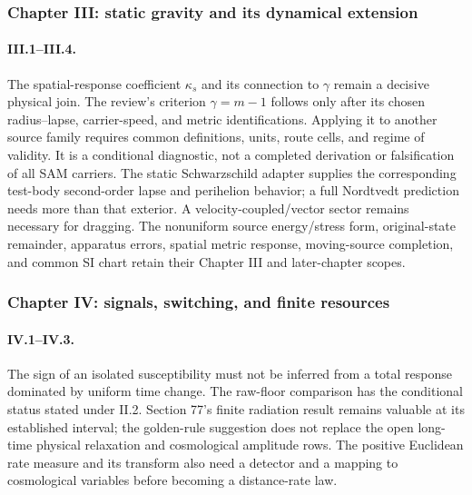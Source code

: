 \subsubsection*{Chapter III: static gravity and its dynamical extension}

\paragraph{III.1--III.4.}
The spatial-response coefficient $\kappa_s$ and its connection to $\gamma$ remain a decisive physical join. The review's criterion $\gamma=m-1$ follows only after its chosen radius--lapse, carrier-speed, and metric identifications. Applying it to another source family requires common definitions, units, route cells, and regime of validity. It is a conditional diagnostic, not a completed derivation or falsification of all SAM carriers. The static Schwarzschild adapter supplies the corresponding test-body second-order lapse and perihelion behavior; a full Nordtvedt prediction needs more than that exterior. A velocity-coupled/vector sector remains necessary for dragging. The nonuniform source energy/stress form, original-state remainder, apparatus errors, spatial metric response, moving-source completion, and common SI chart retain their Chapter III and later-chapter scopes.

\subsubsection*{Chapter IV: signals, switching, and finite resources}

\paragraph{IV.1--IV.3.}
The sign of an isolated susceptibility must not be inferred from a total response dominated by uniform time change. The raw-floor comparison has the conditional status stated under II.2. Section 77's finite radiation result remains valuable at its established interval; the golden-rule suggestion does not replace the open long-time physical relaxation and cosmological amplitude rows. The positive Euclidean rate measure and its transform also need a detector and a mapping to cosmological variables before becoming a distance-rate law.

